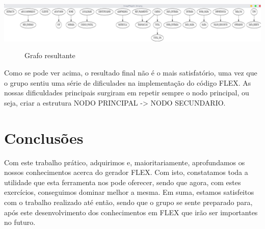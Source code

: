 \documentclass[a4paper]{article}
\begin{document}
\begin{center}
	\includegraphics[scale=0.19]{dot}
	\begin{figure}[!h]
	\caption{Grafo resultante}
	\end{figure}
\end{center}

Como se pode ver acima, o resultado final não é o mais satisfatório, uma vez que o grupo sentiu uma série de dificulades na implementação do código FLEX.
As nossas dificuldades principais surgiram em repetir sempre o nodo principal, ou seja, criar a estrutura NODO PRINCIPAL -> NODO SECUNDARIO.

\section{Conclusões}
\label{sec:conclusao}

Com este trabalho prático, adquirimos e, maioritariamente, aprofundamos os nossos conhecimentos acerca do gerador FLEX. Com isto, constatamos toda a utilidade que esta ferramenta nos pode oferecer, sendo que agora, com estes exercícios, conseguimos dominar melhor a mesma.
Em suma, estamos satisfeitos com o trabalho realizado até então, sendo que o grupo se sente preparado para, após este desenvolvimento dos conhecimentos em FLEX que irão ser importantes no futuro.
\end{document}
